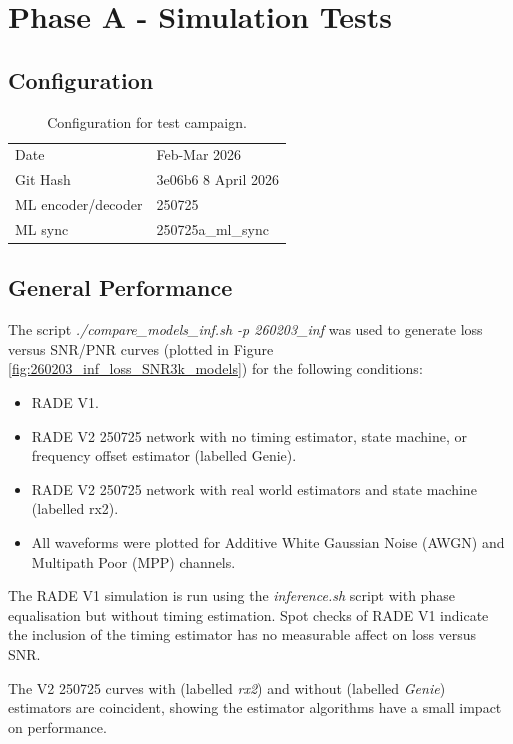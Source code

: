 \documentclass{article}
\begin{document}
\section{Phase A - Simulation Tests}

\subsection{Configuration}

\begin{table} [h]
\caption{Configuration for test campaign.}
\label{tab:time_to_acq}
\centering
\begin{tabular}{ l | l }
 \hline
  Date  & Feb-Mar 2026 \\
  Git Hash & 3e06b6 8 April 2026 \\
  ML encoder/decoder & 250725 \\
  ML sync & 250725a\_ml\_sync \\
 \hline
\end{tabular}
\end{table}

\subsection{General Performance}

The script \emph{./compare\_models\_inf.sh -p 260203\_inf} was used to generate loss versus SNR/PNR curves (plotted in Figure \ref{fig:260203_inf_loss_SNR3k_models}) for the following conditions:
\begin{itemize}
\item RADE V1.
\item RADE V2 250725 network with no timing estimator, state machine, or frequency offset estimator (labelled Genie).
\item RADE V2 250725 network with real world estimators and state machine (labelled rx2).
\item All waveforms were plotted for Additive White Gaussian Noise (AWGN) and Multipath Poor (MPP) channels.
\end{itemize}

The RADE V1 simulation is run using the \emph{inference.sh} script with phase equalisation but without timing estimation.  Spot checks of RADE V1 indicate the inclusion of the timing estimator has no measurable affect on loss versus SNR.

The V2 250725 curves with (labelled \emph{rx2}) and without (labelled \emph{Genie}) estimators are coincident, showing the estimator algorithms have a small impact on performance.
\end{document}

